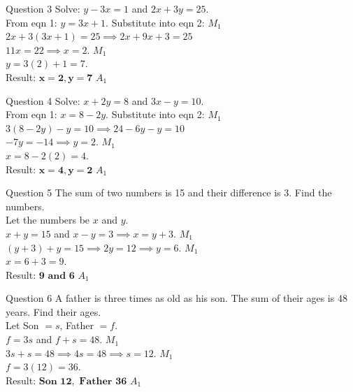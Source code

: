 \documentclass[12pt, a4paper, oneside]{article}
\begin{document}
\begin{solvingbox}{Question 3}
Solve: $y - 3x = 1$ and $2x + 3y = 25$. \\
From eqn 1: $y = 3x + 1$. Substitute into eqn 2: \hfill $M_1$ \\
$2x + 3(3x + 1) = 25 \implies 2x + 9x + 3 = 25$ \\
$11x = 22 \implies x = 2$. \hfill $M_1$ \\
$y = 3(2) + 1 = 7$. \\
Result: $\mathbf{x=2, y=7}$ \hfill $A_1$
\end{solvingbox}

\begin{solvingbox}{Question 4}
Solve: $x + 2y = 8$ and $3x - y = 10$. \\
From eqn 1: $x = 8 - 2y$. Substitute into eqn 2: \hfill $M_1$ \\
$3(8 - 2y) - y = 10 \implies 24 - 6y - y = 10$ \\
$-7y = -14 \implies y = 2$. \hfill $M_1$ \\
$x = 8 - 2(2) = 4$. \\
Result: $\mathbf{x=4, y=2}$ \hfill $A_1$
\end{solvingbox}

\begin{solvingbox}{Question 5}
The sum of two numbers is 15 and their difference is 3. Find the numbers. \\
Let the numbers be $x$ and $y$. \\
$x + y = 15$ and $x - y = 3 \implies x = y + 3$. \hfill $M_1$ \\
$(y + 3) + y = 15 \implies 2y = 12 \implies y = 6$. \hfill $M_1$ \\
$x = 6 + 3 = 9$. \\
Result: $\mathbf{9 \text{ and } 6}$ \hfill $A_1$
\end{solvingbox}

\begin{solvingbox}{Question 6}
A father is three times as old as his son. The sum of their ages is 48 years. Find their ages. \\
Let Son $= s$, Father $= f$. \\
$f = 3s$ and $f + s = 48$. \hfill $M_1$ \\
$3s + s = 48 \implies 4s = 48 \implies s = 12$. \hfill $M_1$ \\
$f = 3(12) = 36$. \\
Result: $\mathbf{\text{Son } 12, \text{ Father } 36}$ \hfill $A_1$
\end{solvingbox}
\end{document}
